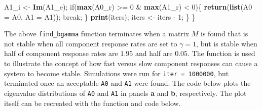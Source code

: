 \documentclass[]{article}
\newenvironment{Shaded}{\begin{snugshade}}{\end{snugshade}}
\newcommand{\KeywordTok}[1]{\textcolor[rgb]{0.13,0.29,0.53}{\textbf{{#1}}}}
\newcommand{\DataTypeTok}[1]{\textcolor[rgb]{0.13,0.29,0.53}{{#1}}}
\newcommand{\DecValTok}[1]{\textcolor[rgb]{0.00,0.00,0.81}{{#1}}}
\newcommand{\StringTok}[1]{\textcolor[rgb]{0.31,0.60,0.02}{{#1}}}
\newcommand{\NormalTok}[1]{{#1}}
\begin{document}
\begin{Shaded}
\begin{Highlighting}[]
        \NormalTok{A1_i   <-}\StringTok{ }\KeywordTok{Im}\NormalTok{(A1_e);}
        \NormalTok{if(}\KeywordTok{max}\NormalTok{(A0_r) >=}\StringTok{ }\DecValTok{0} \NormalTok{&}\StringTok{ }\KeywordTok{max}\NormalTok{(A1_r) <}\StringTok{ }\DecValTok{0}\NormalTok{)\{}
            \KeywordTok{return}\NormalTok{(}\KeywordTok{list}\NormalTok{(}\DataTypeTok{A0 =} \NormalTok{A0, }\DataTypeTok{A1 =} \NormalTok{A1));}
            \NormalTok{break;}
        \NormalTok{\}}
        \KeywordTok{print}\NormalTok{(iters);}
        \NormalTok{iters <-}\StringTok{ }\NormalTok{iters -}\StringTok{ }\DecValTok{1}\NormalTok{;}
    \NormalTok{\}}
\NormalTok{\}}
\end{Highlighting}
\end{Shaded}

The above \texttt{find\_bgamma} function terminates when a matrix \(M\)
is found that is not stable when all component response rates are set to
\(\gamma = 1\), but is stable when half of component response rates are
\(1.95\) and half are \(0.05\). The function is used to illustrate the
concept of how fast versus slow component responses can cause a system
to become stable. Simulations were run for \texttt{iter\ =\ 1000000},
but terminated once an acceptable \texttt{A0} and \texttt{A1} were
found. The code below plots the eigenvalue distributions of \texttt{A0}
and \texttt{A1} in panels \textbf{a} and \textbf{b}, respectively. The
plot itself can be recreated with the function and code below.
\end{document}

